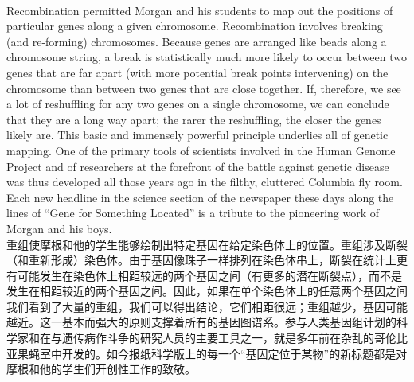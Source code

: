 \documentclass{article}
\begin{document}
\\
Recombination permitted Morgan and his students to map out the positions of particular genes along a given chromosome. Recombination involves breaking (and re-forming) chromosomes. Because genes are arranged like beads along a chromosome string, a break is statistically much more likely to occur between two genes that are far apart (with more potential break points intervening) on the chromosome than between two genes that are close together. If, therefore, we see a lot of reshuffling for any two genes on a single chromosome, we can conclude that they are a long way apart; the rarer the reshuffling, the closer the genes likely are. This basic and immensely powerful principle underlies all of genetic mapping. One of the primary tools of scientists involved in the Human Genome Project and of researchers at the forefront of the battle against genetic disease was thus developed all those years ago in the filthy, cluttered Columbia fly room. Each new headline in the science section of the newspaper these days along the lines of “Gene for Something Located” is a tribute to the pioneering work of Morgan and his boys.\\
重组使摩根和他的学生能够绘制出特定基因在给定染色体上的位置。重组涉及断裂（和重新形成）染色体。由于基因像珠子一样排列在染色体串上，断裂在统计上更有可能发生在染色体上相距较远的两个基因之间（有更多的潜在断裂点），而不是发生在相距较近的两个基因之间。因此，如果在单个染色体上的任意两个基因之间我们看到了大量的重组，我们可以得出结论，它们相距很远；重组越少，基因可能越近。这一基本而强大的原则支撑着所有的基因图谱系。参与人类基因组计划的科学家和在与遗传病作斗争的研究人员的主要工具之一，就是多年前在杂乱的哥伦比亚果蝇室中开发的。如今报纸科学版上的每一个“基因定位于某物”的新标题都是对摩根和他的学生们开创性工作的致敬。\\
\end{document}
